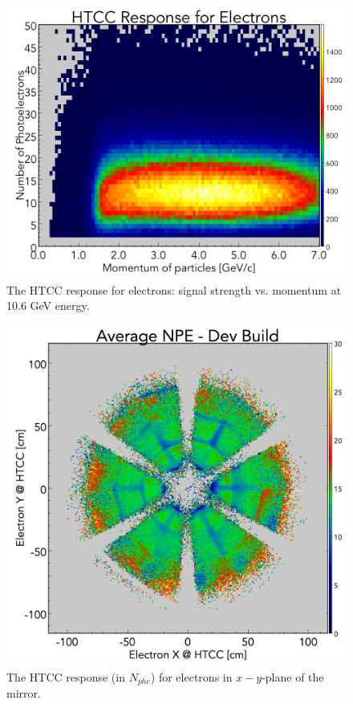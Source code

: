 \begin{figure}[!ht]
    \centering
    \includegraphics[width=1.0\linewidth,trim={0.0cm 0.0cm 0.0cm 1.73cm},clip]{images/HTCC_Response_run4013.png}
    \caption{The HTCC response for electrons: signal strength vs. momentum at 10.6 GeV energy.}
    \label{fig:HTCC_Response_run4013}
\end{figure}

\begin{figure}[!ht]
    \centering
    \includegraphics[width=1.0\linewidth,trim={0.0cm 0.0cm 0.0cm 1.67cm},clip]{images/avgNPE_Theta_Phi_Dev_Build-2_NO_HOLES.png}
    \caption{The HTCC response (in $N_{phe}$) for electrons in $x-y$-plane of the mirror.}
    \label{fig:avgNPE_Theta_Phi_Dev_Build-2_NO_HOLES}
\end{figure}

